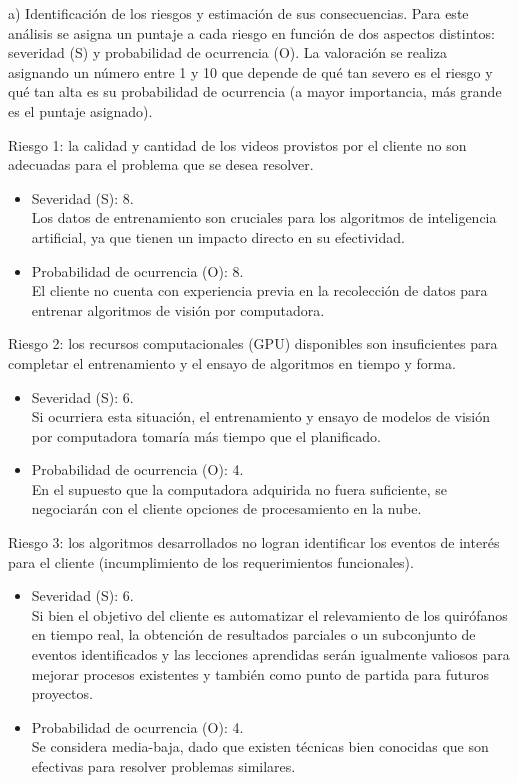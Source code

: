 \documentclass[
11pt, %
]{charter}
\begin{document}
a) Identificación de los riesgos y estimación de sus consecuencias. Para este análisis se asigna un puntaje a cada riesgo en función de dos aspectos distintos: severidad (S)  y probabilidad de ocurrencia (O). La valoración se realiza asignando un número entre 1 y 10 que depende de qué tan severo es el riesgo y qué tan alta es su probabilidad de ocurrencia (a mayor importancia, más grande es el puntaje asignado).

Riesgo 1: la calidad y cantidad de los videos provistos por el cliente no son adecuadas para el problema que se desea resolver.

\begin{itemize}
	\item Severidad (S): 8.\\
	Los datos de entrenamiento son cruciales para los algoritmos de inteligencia artificial, ya que tienen un impacto directo en su efectividad.
	\item Probabilidad de ocurrencia (O): 8.\\
	El cliente no cuenta con experiencia previa en la recolección de datos para entrenar algoritmos de visión por computadora. 
\end{itemize}   

Riesgo 2: los recursos computacionales (GPU) disponibles son insuficientes para completar el entrenamiento y el ensayo de algoritmos en tiempo y forma.
\begin{itemize}
	\item Severidad (S): 6. \\
	Si ocurriera esta situación, el entrenamiento y ensayo de modelos de visión por computadora tomaría más tiempo que el planificado.
	\item Probabilidad de ocurrencia (O): 4. \\
	En el supuesto que la computadora adquirida no fuera suficiente, se negociarán con el cliente opciones de procesamiento en la nube.  %
\end{itemize}

\pagebreak

Riesgo 3: los algoritmos desarrollados no logran identificar los eventos de interés para el cliente (incumplimiento de los requerimientos funcionales).
\begin{itemize}
	\item Severidad (S): 6. \\
	Si bien el objetivo del cliente es automatizar el relevamiento de los quirófanos en tiempo real, la obtención de resultados parciales o un subconjunto de eventos identificados y las lecciones aprendidas serán igualmente valiosos para mejorar procesos existentes y también como punto de partida para futuros proyectos. 
	\item Probabilidad de ocurrencia (O): 4. \\
	Se considera media-baja, dado que existen técnicas bien conocidas que son efectivas para resolver problemas similares.
\end{itemize}
\end{document}
